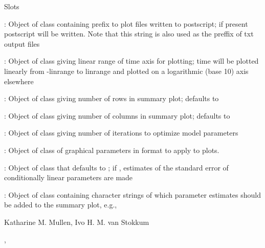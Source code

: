 \begin{Section}{Slots}
{\item[\code{makeps}:] Object of class  containing 
prefix to plot files written to postscript; 
if present postscript will be written. Note that this string is also 
used as the preffix of txt output files 
\item[\code{linrange}:] Object of class  giving linear
range of time axis for plotting; time will be plotted linearly from
-linrange to linrange and plotted on a logarithmic (base 10) axis elsewhere
\item[\code{summaryplotrow}:] Object of class  giving  
number of rows in summary plot; defaults to 
\item[\code{summaryplotcol}:] Object of class  giving  
number of columns in summary plot; defaults to 
\item[\code{iter}:] Object of class  giving  number of iterations to optimize model parameters
\item[\code{paropt}:] Object of class  
of graphical parameters in format  
to apply to plots. 
\item[\code{stderrclp}:] Object of class  that defaults 
to ; if , estimates of the standard error of 
conditionally linear parameters are made
\item[\code{addest}:] Object of class  containing 
character strings of which parameter estimates should be added to the 
summary plot, e.g.,   
}
\end{Section}
\begin{Author}\relax
Katharine M. Mullen, Ivo H. M. van Stokkum
\end{Author}
\begin{SeeAlso}\relax
{}, 
\end{SeeAlso}

